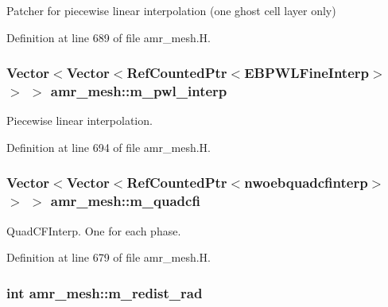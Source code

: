 Patcher for piecewise linear interpolation (one ghost cell layer only) 



Definition at line 689 of file amr\+\_\+mesh.\+H.

\subsubsection[{\texorpdfstring{m\+\_\+pwl\+\_\+interp}{m_pwl_interp}}]{\setlength{\rightskip}{0pt plus 5cm}Vector$<$Vector$<$Ref\+Counted\+Ptr$<$E\+B\+P\+W\+L\+Fine\+Interp$>$ $>$ $>$ amr\+\_\+mesh\+::m\+\_\+pwl\+\_\+interp\hspace{0.3cm}{\ttfamily [protected]}}\hypertarget{classamr__mesh_abd395ab434bb13965d41421f995b2da7}{}\label{classamr__mesh_abd395ab434bb13965d41421f995b2da7}


Piecewise linear interpolation. 



Definition at line 694 of file amr\+\_\+mesh.\+H.

\subsubsection[{\texorpdfstring{m\+\_\+quadcfi}{m_quadcfi}}]{\setlength{\rightskip}{0pt plus 5cm}Vector$<$Vector$<$Ref\+Counted\+Ptr$<${\bf nwoebquadcfinterp}$>$ $>$ $>$ amr\+\_\+mesh\+::m\+\_\+quadcfi\hspace{0.3cm}{\ttfamily [protected]}}\hypertarget{classamr__mesh_a48b66992edba04104b2c825fa781b456}{}\label{classamr__mesh_a48b66992edba04104b2c825fa781b456}


Quad\+C\+F\+Interp. One for each phase. 



Definition at line 679 of file amr\+\_\+mesh.\+H.

\subsubsection[{\texorpdfstring{m\+\_\+redist\+\_\+rad}{m_redist_rad}}]{\setlength{\rightskip}{0pt plus 5cm}int amr\+\_\+mesh\+::m\+\_\+redist\+\_\+rad\hspace{0.3cm}{\ttfamily [protected]}}\hypertarget{classamr__mesh_abc978abb707e68962929b519c9ece99f}{}\label{classamr__mesh_abc978abb707e68962929b519c9ece99f}


